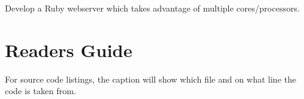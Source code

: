 
Develop a Ruby webserver which takes advantage of multiple cores/processors.

\section{Readers Guide}

For source code listings, the caption will show which file and on what line
the code is taken from.

